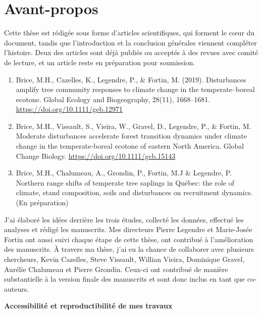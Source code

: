 \francais

\chapter*{Avant-propos}

Cette thèse est rédigée sous forme d'articles scientifiques, qui forment
le c\oe{}ur du document, tandis que l'introduction et la conclusion
générales viennent compléter l'histoire. Deux des articles sont déjà
publiés ou acceptés à des revues avec comité de lecture, et un article
reste en préparation pour soumission.

\begin{enumerate}
\def\labelenumi{\arabic{enumi}.}
\item
  Brice, M.H., Cazelles, K., Legendre, P., \& Fortin, M. (2019).
  Disturbances amplify tree community responses to climate change in the
  temperate--boreal ecotone. Global Ecology and Biogeography, 28(11),
  1668--1681. \url{https://doi.org/10.1111/geb.12971}
\item
  Brice, M.H., Vissault, S., Vieira, W., Gravel, D., Legendre, P., \&
  Fortin, M. Moderate disturbances accelerate forest transition dynamics
  under climate change in the temperate-boreal ecotone of eastern North
  America. Global Change Biology.
  \url{https://doi.org/10.1111/gcb.15143}
\item
  Brice, M.H., Chalumeau, A., Grondin, P., Fortin, M.J \& Legendre, P.
  Northern range shifts of temperate tree saplings in Québec: the role
  of climate, stand composition, soils and disturbances on recruitment
  dynamics. (En préparation)
\end{enumerate}

J'ai élaboré les idées derrière les trois études, collecté les données,
effectué les analyses et rédigé les manuscrits. Mes directeurs Pierre
Legendre et Marie-Josée Fortin ont aussi suivi chaque étape de cette
thèse, ont contribué à l'amélioration des manuscrits. À travers ma
thèse, j'ai eu la chance de collaborer avec plusieurs chercheurs, Kevin
Cazelles, Steve Vissault, Willian Vieira, Dominique Gravel, Aurélie
Chalumeau et Pierre Grondin. Ceux-ci ont contribué de manière
substantielle à la version finale des manuscrits et sont donc inclus en
tant que co-auteurs.

\newpage

\noindent
\textbf{\large Accessibilité et reproductibilité de mes travaux}

